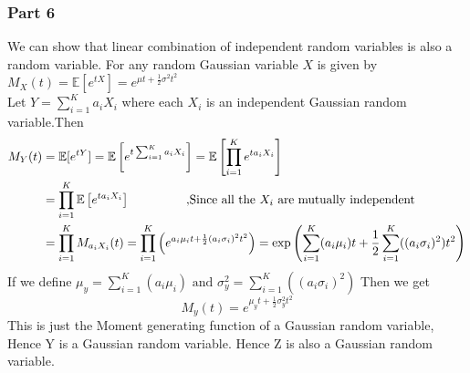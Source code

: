 \subsubsection{Part 6}
    We can show that linear combination of independent random variables is also a random variable. For any random Gaussian variable $X$ is given by $M_X(t)=\mathbb{E}[e^{tX}]=e^{\mu t+\frac{1}{2} \sigma^2t^2}$\\
    Let $Y=\sum_{i=1}^K a_i X_i$ where each $X_i$ is an independent Gaussian random variable.Then 
    \begin{align*}
        M_Y(t) &= \mathbb{E}[e^{tY}]= \mathbb{E}\left[e^{t\sum_{i=1}^K a_i X_i}\right] = \mathbb{E}\left[\prod_{i=1}^Ke^{ta_i X_i}\right]\\
        &=\prod_{i=1}^K\mathbb{E}\left[e^{ta_i X_i}\right] \hspace{15mm} \text{ ,Since all the $X_i$ are mutually independent}\\
        &= \prod_{i=1}^KM_{a_iX_i}(t) =\prod_{i=1}^K\left(  e^{a_i\mu_i t+\frac{1}{2} (a_i\sigma_i)^2t^2}\right) = \exp\left({\sum_{i=1}^K(a_i\mu_i) t+\frac{1}{2} \sum_{i=1}^K((a_i\sigma_i)^2)t^2}\right)\\
    \end{align*}
    If we define $\mu_y = \sum_{i=1}^K(a_i\mu_i)\text{ and }\sigma_y^2 = \sum_{i=1}^K((a_i\sigma_i)^2)$ Then we get 
    \begin{equation}
        M_y(t) = e^{\mu_y t+\frac{1}{2} \sigma_y^2t^2}
    \end{equation}
    This is just the Moment generating function of a Gaussian random variable, Hence Y is a Gaussian random variable. Hence Z is also a Gaussian random variable.

    
